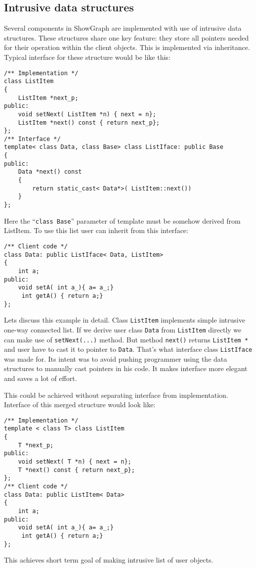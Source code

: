 \documentclass[11pt,twoside,a4paper]{article}
\begin{document}
\subsection{Intrusive data structures}
Several components in ShowGraph are implemented with use of intrusive data structures. These structures share one key feature: they store all pointers needed for their operation within the client objects. This is implemented via inheritance. Typical interface for these structure would be like this:
\begin{lstlisting}
/** Implementation */
class ListItem
{
    ListItem *next_p;
public:
    void setNext( ListItem *n) { next = n};
    ListItem *next() const { return next_p};
};
/** Interface */
template< class Data, class Base> class ListIface: public Base
{
public:
    Data *next() const
    {
        return static_cast< Data*>( ListItem::next())
    }
};
\end{lstlisting}
Here the ``\lstinline{class Base}'' parameter of template must be somehow derived from ListItem. To use this list user can inherit from this interface:
\begin{lstlisting}
/** Client code */
class Data: public ListIface< Data, ListItem> 
{
    int a;
public:
    void setA( int a_){ a= a_;}
	 int getA() { return a;}
};
\end{lstlisting}
Lets discuss this example in detail. Class \lstinline{ListItem} implements simple intrusive one-way connected list. If we derive user class \lstinline{Data} from \lstinline{ListItem} directly we can make use of \lstinline{setNext(...)} method. But method \lstinline{next()} returns \lstinline{ListItem *} and user have to cast it to pointer to \lstinline{Data}. That's what interface class \lstinline{ListIface} was made for. Its intent was to avoid pushing programmer using the data structures to manually cast pointers in his code. It makes interface more elegant and saves a lot of effort. 

This could be achieved without separating interface from implementation. Interface of this merged structure would look like:
\begin{lstlisting}
/** Implementation */
template < class T> class ListItem
{
    T *next_p;
public:
    void setNext( T *n) { next = n};
    T *next() const { return next_p};
};
/** Client code */
class Data: public ListItem< Data> 
{
    int a;
public:
    void setA( int a_){ a= a_;}
	 int getA() { return a;}
};
\end{lstlisting}
This achieves short term goal of making intrusive list of user objects. 
\end{document}
